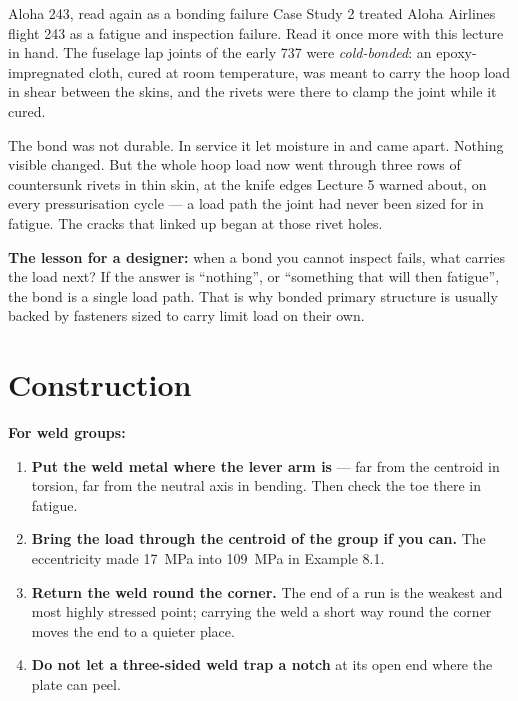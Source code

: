 \documentclass[11pt,a4paper]{article}
\begin{document}
\begin{aerobox}{Aloha 243, read again as a bonding failure}
Case Study 2 treated Aloha Airlines flight 243 as a fatigue and inspection failure. Read it once
more with this lecture in hand. The fuselage lap joints of the early 737 were \emph{cold-bonded}:
an epoxy-impregnated cloth, cured at room temperature, was meant to carry the hoop load in shear
between the skins, and the rivets were there to clamp the joint while it cured.

\medskip
The bond was not durable. In service it let moisture in and came apart. Nothing visible changed.
But the whole hoop load now went through three rows of countersunk rivets in thin skin, at the
knife edges Lecture 5 warned about, on every pressurisation cycle --- a load path the joint had
never been sized for in fatigue. The cracks that linked up began at those rivet holes.

\medskip
\textbf{The lesson for a designer:} when a bond you cannot inspect fails, what carries the load
next? If the answer is ``nothing'', or ``something that will then fatigue'', the bond is a single
load path. That is why bonded primary structure is usually backed by fasteners sized to carry limit
load on their own.
\end{aerobox}

\section{Construction}

\textbf{For weld groups:}
\begin{enumerate}[leftmargin=*,itemsep=2pt]
\item \textbf{Put the weld metal where the lever arm is} --- far from the centroid in torsion, far
  from the neutral axis in bending. Then check the toe there in fatigue.
\item \textbf{Bring the load through the centroid of the group if you can.} The eccentricity made
  \SI{17}{MPa} into \SI{109}{MPa} in Example 8.1.
\item \textbf{Return the weld round the corner.} The end of a run is the weakest and most highly
  stressed point; carrying the weld a short way round the corner moves the end to a quieter place.
\item \textbf{Do not let a three-sided weld trap a notch} at its open end where the plate can peel.
\end{enumerate}
\end{document}
